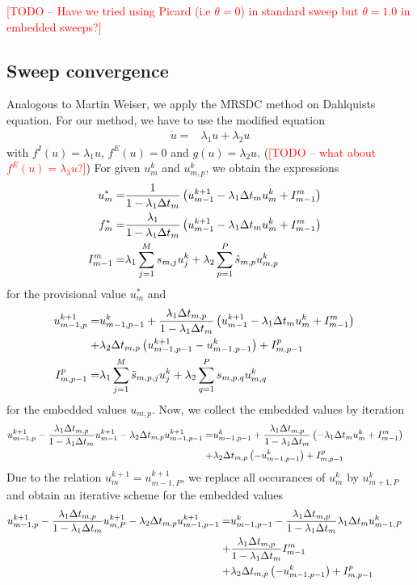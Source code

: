 \documentclass{article}
\newcommand{\todo}[1]{\textcolor{red}{[TODO -- #1]}}
\begin{document}
\todo{Have we tried using Picard (i.e $\theta=0$) in standard sweep but $\theta = 1.0$ in embedded sweeps?}

\subsection*{Sweep convergence}
Analogous to Martin Weiser, we apply the MRSDC method on Dahlquists equation. For our method, we have to use the modified equation
\begin{align}
 \dot{u}=&\lambda_1 u + \lambda_2 u
\end{align}
with $f^I(u)=\lambda_1 u$, $f^E(u)=0$ and $g(u)=\lambda_2 u$. (\todo{what about $f^E(u)=\lambda_3u$?}) 
For given $u^k_{m}$ and $u^{k}_{m,p}$, we obtain the expressions
\begin{align*}
 u^*_m=&\frac{1}{1-\lambda_1\Delta t_m }\left(u^{k+1}_{m-1}-\lambda_1\Delta t_m u^{k}_m+ I_{m-1}^m\right) \cr
 f^*_m =&\frac{\lambda_1}{1-\lambda_1\Delta t_m }\left(u^{k+1}_{m-1}-\lambda_1\Delta t_m u^{k}_m+ I_{m-1}^m\right) \cr
 I_{m-1}^m =& \lambda_1 \sum_{j=1}^M s_{m,j} u^{k}_j + \lambda_2 \sum_{p=1}^{P} \hat{s}_{m,p} u^{k}_{m,p}
\end{align*}
for the provisional value $u^*_m$ and 
\begin{align*}
 u^{k+1}_{m-1,p}=&u^{k}_{m-1,p-1} +  \frac{\lambda_1\Delta t_{m,p}}{1-\lambda_1\Delta t_m }\left(u^{k+1}_{m-1}-\lambda_1\Delta t_m u^{k}_m+ I_{m-1}^m\right) \cr
   +&\lambda_2 \Delta t_{m,p}\left(u^{k+1}_{m-1,p-1}-u^{k}_{m-1,p-1}\right) + I_{m,p-1}^p \cr
 I_{m,p-1}^p =& \lambda_1 \sum_{j=1}^M \tilde{s}_{m,p,j} u^k_j + \lambda_2 \sum_{q=1}^P s_{m,p,q} u^k_{m,q} %
\end{align*}
for the embedded values $u_{m,p}$. Now, we collect the embedded values by iteration 
\begin{align*}
 u^{k+1}_{m-1,p}-\frac{\lambda_1 \Delta t_{m,p}}{1-\lambda_1 \Delta t_{m}}u^{k+1}_{m-1}-\lambda_2\Delta t_{m,p} u^{k+1}_{m-1,p-1}=&u^{k}_{m-1,p-1} +  \frac{\lambda_1\Delta t_{m,p}}{1-\lambda_1\Delta t_m }\left(-\lambda_1\Delta t_m u^{k}_m+ I_{m-1}^m\right) \cr
   +&\lambda_2 \Delta t_{m,p}\left(-u^{k}_{m-1,p-1}\right) + I_{m,p-1}^p
\end{align*}
Due to the relation $u^{k+1}_{m}=u^{k+1}_{m-1,P}$, we replace all occurances of $u^{k}_m$ by $u^{k}_{m+1,P}$ and obtain an iterative scheme for the embedded values
\begin{align*}
 u^{k+1}_{m-1,p}-\frac{\lambda_1 \Delta t_{m,p}}{1-\lambda_1 \Delta t_{m}}u^{k+1}_{m,P}-\lambda_2\Delta t_{m,p} u^{k+1}_{m-1,p-1}=&u^{k}_{m-1,p-1} -  \frac{\lambda_1\Delta t_{m,p}}{1-\lambda_1\Delta t_m }\lambda_1\Delta t_m u^{k}_{m-1,P} \cr
   +&\frac{\lambda_1\Delta t_{m,p}}{1-\lambda_1\Delta t_m }I_{m-1}^m\cr
   +&\lambda_2 \Delta t_{m,p}\left(-u^{k}_{m-1,p-1}\right) + I_{m,p-1}^p
\end{align*}
\end{document}

